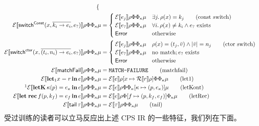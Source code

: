\begin{align*}
\begin{cases}
  \end{cases}\\
  \mathcal{E}\sem{\switch^{\Const}(x, \overline{k_i \to e_i}, e_?)}\Env\FunTab\KontTab\mu &=
  \begin{cases}
    \mathcal{E}\sem{e_j}\Env\FunTab\KontTab\mu
    & \exists j.\, \Env(x) = k_j \tag{const switch} \\
    \mathcal{E}\sem{e_? }\Env\FunTab\KontTab\mu
    & \forall i.\, \Env(x) \neq k_i \land e_? \ \text{exists} \\
    \mathsf{Error} & \text{otherwise}
  \end{cases}\\
  \mathcal{E}\sem{\switch^{\ctor}(x, \overline{(t_i, n_i) \to e_i}, e_?)}\Env\FunTab\KontTab\mu &=
  \begin{cases}
    \mathcal{E}\sem{e_j}\Env\FunTab\KontTab\mu
    & \Env(x) = (t_j, \bar{v}) \land |\bar{v}| = n_j \tag{ctor switch} \\
    \mathcal{E}\sem{e_?}\Env\FunTab\KontTab\mu
    & \text{no match}; e_?\ \text{exists} \\
    \mathsf{Error} & \text{otherwise}
  \end{cases}\\
  \mathcal{E}\sem{\fail}\Env\FunTab\KontTab\mu &= \texttt{MATCH-FAILURE} \tag{matchfail}\\
  \mathcal{E}\sem{\letone x = r\, \mathbf{in}\, e}\Env\FunTab\KontTab\mu &=
  \mathcal{E}\sem{e}\Env[x \mapsto \mathcal{R}\sem{r}\Env]\FunTab\KontTab\mu \tag{let1}\\
  \footnotemark\mathcal{E}\sem{\letK\, \kappa(p) = e_\kappa\, \mathbf{in}\, e}\Env\FunTab\KontTab\mu &=
  \mathcal{E}\sem{e}\Env\FunTab\KontTab[\kappa \mapsto (p, e_\kappa)]\mu \tag{letKont}\\
  \mathcal{E}\sem{\letRec\, f(p, k_f) = e_f\, \mathbf{in}\, e}\Env\FunTab\KontTab\mu &=
  \mathcal{E}\sem{e}\Env\FunTab[f \mapsto (p, k_f, e_f)]\KontTab\mu \tag{letRec}\\
  \mathcal{E}\sem{\mathsf{tail}\, \tau}\Env\FunTab\KontTab\mu &=
  \mathcal{E}\sem{\tau}\Env\FunTab\KontTab\mu \tag{tail}
\end{align*}
\endgroup
受过训练的读者可以立马反应出上述 CPS IR 的一些特征，我们列在下面。

\addtocounter{footnote}{-2}

